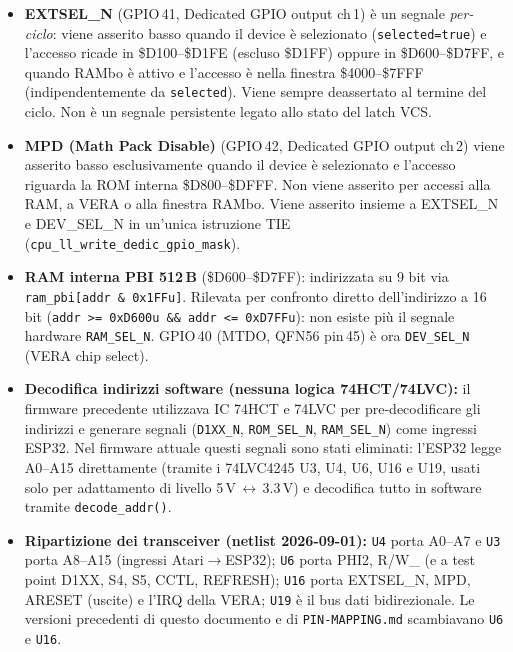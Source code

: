\documentclass[12pt, a4paper]{article}
\begin{document}
\begin{itemize}
  \item \textbf{EXTSEL\_N} (GPIO\,41, Dedicated GPIO output ch\,1) è un segnale \emph{per-ciclo}: viene asserito basso quando il device è selezionato (\texttt{selected=true}) e l'accesso ricade in \$D100--\$D1FE (escluso \$D1FF) oppure in \$D600--\$D7FF, e quando RAMbo è attivo e l'accesso è nella finestra \$4000--\$7FFF (indipendentemente da \texttt{selected}). Viene sempre deassertato al termine del ciclo. Non è un segnale persistente legato allo stato del latch VCS.

  \item \textbf{MPD (Math Pack Disable)} (GPIO\,42, Dedicated GPIO output ch\,2) viene asserito basso esclusivamente quando il device è selezionato e l'accesso riguarda la ROM interna \$D800--\$DFFF. Non viene asserito per accessi alla RAM, a VERA o alla finestra RAMbo. Viene asserito insieme a EXTSEL\_N e DEV\_SEL\_N in un'unica istruzione TIE (\texttt{cpu\_ll\_write\_dedic\_gpio\_mask}).

  \item \textbf{RAM interna PBI 512\,B} (\$D600--\$D7FF): indirizzata su 9 bit via \texttt{ram\_pbi[addr \& 0x1FFu]}. Rilevata per confronto diretto dell'indirizzo a 16\,bit (\texttt{addr >= 0xD600u \&\& addr <= 0xD7FFu}): non esiste più il segnale hardware \texttt{RAM\_SEL\_N}. GPIO\,40 (MTDO, QFN56 pin\,45) è ora \texttt{DEV\_SEL\_N} (VERA chip select).

  \item \textbf{Decodifica indirizzi software (nessuna logica 74HCT/74LVC):} il firmware precedente utilizzava IC 74HCT e 74LVC per pre-decodificare gli indirizzi e generare segnali (\texttt{D1XX\_N}, \texttt{ROM\_SEL\_N}, \texttt{RAM\_SEL\_N}) come ingressi ESP32. Nel firmware attuale questi segnali sono stati eliminati: l'ESP32 legge A0--A15 direttamente (tramite i 74LVC4245 U3, U4, U6, U16 e U19, usati solo per adattamento di livello 5\,V\,$\leftrightarrow$\,3.3\,V) e decodifica tutto in software tramite \texttt{decode\_addr()}.

  \item \textbf{Ripartizione dei transceiver (netlist 2026-09-01):} \texttt{U4} porta A0--A7 e \texttt{U3} porta A8--A15 (ingressi Atari$\rightarrow$ESP32); \texttt{U6} porta PHI2, R/W\_ (e a test point D1XX, S4, S5, CCTL, REFRESH); \texttt{U16} porta EXTSEL\_N, MPD, ARESET (uscite) e l'IRQ della VERA; \texttt{U19} è il bus dati bidirezionale. Le versioni precedenti di questo documento e di \texttt{PIN-MAPPING.md} scambiavano \texttt{U6} e \texttt{U16}.


\end{itemize}
\end{document}
